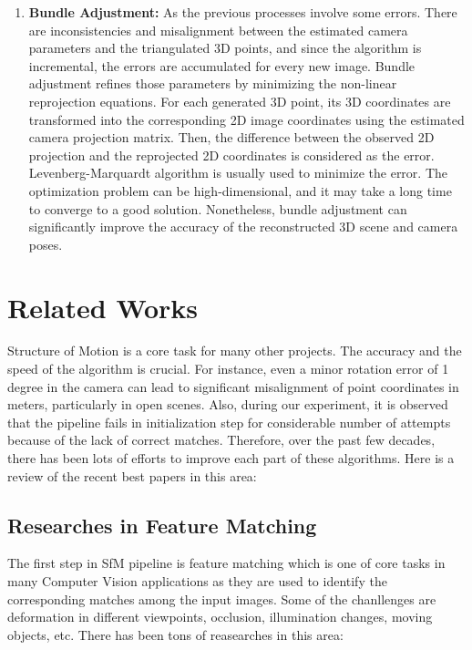 \documentclass[11pt]{article}
\begin{document}
\begin{enumerate}
        \item \textbf{Bundle Adjustment:} As the previous processes involve some errors. There are inconsistencies
        and misalignment between the estimated camera parameters and the triangulated 3D points, and since the algorithm
        is incremental, the errors are accumulated for every new image. Bundle adjustment refines those parameters by
        minimizing the non-linear reprojection equations. For each generated 3D point, its 3D coordinates are
        transformed into the corresponding 2D image coordinates using the estimated camera projection matrix.
        Then, the difference between the observed 2D projection and the reprojected 2D coordinates is considered as the error.
        Levenberg-Marquardt algorithm is usually used to minimize the error.
        The optimization problem can be high-dimensional, and it may take a long time to converge to a good solution.
        Nonetheless, bundle adjustment can significantly improve the accuracy of the reconstructed 3D scene and camera poses.

    \end{enumerate}

    \section{Related Works}
    Structure of Motion is a core task for many other projects. The accuracy and the speed
    of the algorithm is crucial. For instance, even a minor rotation error of 1 degree in the camera can lead
    to significant misalignment of point coordinates in meters, particularly in open scenes. Also, during our
    experiment, it is observed that the pipeline fails in initialization step for considerable number of attempts
    because of the lack of correct matches.
    Therefore, over the past few decades, there has been lots of efforts to improve each part of these algorithms.
    Here is a review of the recent best papers in this area:

    \subsection{Researches in Feature Matching}
    The first step in SfM pipeline is feature matching which
    is one of core tasks in many Computer Vision applications as they are used to identify the corresponding
    matches among the input images. Some of the chanllenges are deformation in different viewpoints, occlusion,
    illumination changes, moving objects, etc. There has been tons of reasearches in this area:
\end{document}
